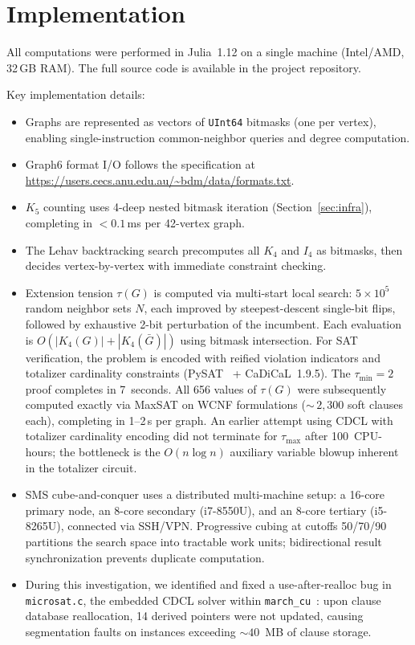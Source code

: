 \documentclass[11pt,a4paper]{article}
\theoremstyle{definition}
\theoremstyle{remark}
\begin{document}

\section{Implementation}
\label{sec:implementation}

All computations were performed in Julia~1.12 on a single machine
(Intel/AMD, 32\,GB RAM).  The full source code is available
in the project repository.

Key implementation details:
\begin{itemize}
  \item Graphs are represented as vectors of \texttt{UInt64}
    bitmasks (one per vertex), enabling single-instruction
    common-neighbor queries and degree computation.
  \item Graph6 format I/O follows the specification at
    \url{https://users.cecs.anu.edu.au/~bdm/data/formats.txt}.
  \item $K_5$ counting uses 4-deep nested bitmask iteration
    (Section~\ref{sec:infra}), completing in $< 0.1$\,ms
    per 42-vertex graph.
  \item The Lehav backtracking search precomputes all $K_4$
    and $I_4$ as bitmasks, then decides vertex-by-vertex
    with immediate constraint checking.
  \item Extension tension $\tau(G)$ is computed via multi-start
    local search: $5 \times 10^5$ random neighbor sets $N$,
    each improved by steepest-descent single-bit flips, followed
    by exhaustive 2-bit perturbation of the incumbent.  Each
    evaluation is $O(|K_4(G)| + |K_4(\bar{G})|)$ using bitmask
    intersection.  For SAT verification, the problem is encoded
    with reified violation indicators and totalizer cardinality
    constraints (PySAT~\cite{PySAT} + CaDiCaL~1.9.5).
    The $\tau_{\min} = 2$ proof completes in 7~seconds.
    All 656 values of $\tau(G)$ were subsequently computed exactly
    via MaxSAT on WCNF formulations (${\sim}\,2{,}300$ soft
    clauses each), completing in 1--2\,s per graph.
    An earlier attempt using CDCL with totalizer cardinality
    encoding did not terminate for $\tau_{\max}$ after
    100~CPU-hours; the bottleneck is the $O(n \log n)$
    auxiliary variable blowup inherent in the totalizer circuit.
  \item SMS cube-and-conquer uses a distributed multi-machine setup:
    a 16-core primary node, an 8-core secondary (i7-8550U),
    and an 8-core tertiary (i5-8265U), connected via SSH/VPN.
    Progressive cubing at cutoffs 50/70/90 partitions the
    search space into tractable work units; bidirectional
    result synchronization prevents duplicate computation.
  \item During this investigation, we identified and fixed a
    use-after-realloc bug in \texttt{microsat.c}, the embedded
    CDCL solver within \texttt{march\_cu}~\cite{HeuleCnC}:
    upon clause database reallocation, 14 derived pointers were
    not updated, causing segmentation faults on instances
    exceeding $\sim\!40$~MB of clause storage.
\end{itemize}
\end{document}
